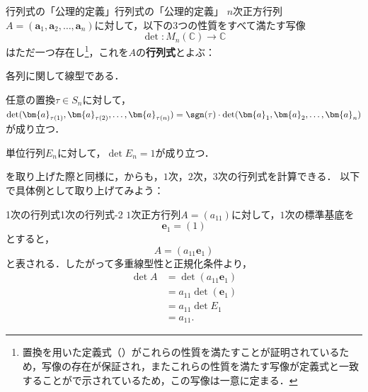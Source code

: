 \begin{definition}{行列式の「公理的定義」}{行列式の「公理的定義」}
  $n$次正方行列$A = (\bm{a}_1, \bm{a}_2, \dots, \bm{a}_n)$に対して，以下の3つの性質をすべて満たす写像
  \[
  \det \colon M_n(\mathbb{C}) \to \mathbb{C}
  \]
  はただ一つ存在し\footnote{置換を用いた定義式（）がこれらの性質を満たすことが証明されているため，写像の存在が保証され，またこれらの性質を満たす写像が定義式と一致することがで示されているため，この写像は一意に定まる．}，これを$A$の\textbf{行列式}とよぶ：
  \begin{description}[labelwidth=5\zw,leftmargin=!, itemsep=0pt]
   \item [多重線型性]各列に関して線型である．
   \item [交代性]任意の置換$\tau \in S_n$に対して，$\det(\bm{a}_{\tau(1)}, \bm{a}_{\tau(2)}, \dots, \bm{a}_{\tau(n)}) = \sgn(\tau) \cdot \det(\bm{a}_1, \bm{a}_2, \dots, \bm{a}_n)$が成り立つ．
   \item [正規化条件]単位行列$E_n$に対して，$\det E_n = 1$が成り立つ．
  \end{description}
\end{definition}

を取り上げた際と同様に，からも，$1$次，$2$次，$3$次の行列式を計算できる．
以下で具体例として取り上げてみよう：

\begin{example}{1次の行列式}{1次の行列式-2}
  $1$次正方行列$A=(a_{11})$に対して，$1$次の標準基底を
  \[
    \bm{e}_1=(1)
  \]
  とすると，
  \[
    A=(a_{11}\bm{e}_1)
  \]
  と表される．したがって多重線型性と正規化条件より，
  \begin{align*}
    \det A
    &=\det(a_{11}\bm{e}_1)\\
    &=a_{11}\det(\bm{e}_1)\\
    &=a_{11}\det E_1\\
    &=a_{11}.
  \end{align*}
\end{example}

